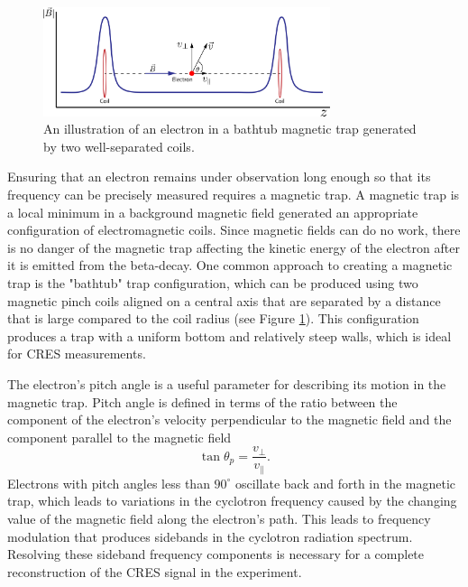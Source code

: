 \begin{figure}[htbp]
    \centering
    \includegraphics*[width=0.75\textwidth]{figs/Chapter-3/230628_bathtub_trap.png}
    \caption{\label{fig:chap3-bathtub-trap}An illustration of an electron in a bathtub magnetic trap generated by two well-separated coils.}
\end{figure}

Ensuring that an electron remains under observation long enough so that its frequency can be precisely measured requires a magnetic trap. A magnetic trap is a local minimum in a background magnetic field generated an appropriate configuration of electromagnetic coils. Since magnetic fields can do no work, there is no danger of the magnetic trap affecting the kinetic energy of the electron after it is emitted from the beta-decay. One common approach to creating a magnetic trap is the "bathtub" trap configuration, which can be produced using two magnetic pinch coils aligned on a central axis that are separated by a distance that is large compared to the coil radius (see Figure \ref{fig:chap3-bathtub-trap}). This configuration produces a trap with a uniform bottom and relatively steep walls, which is ideal for CRES measurements. 

The electron's pitch angle is a useful parameter for describing its motion in the magnetic trap. Pitch angle is defined in terms of the ratio between the component of the electron's velocity perpendicular to the magnetic field and the component parallel to the magnetic field
\begin{equation}
    \tan{\theta_p}=\frac{v_\perp}{v_\parallel}.
\end{equation}
Electrons with pitch angles less than $90^\circ$ oscillate back and forth in the magnetic trap, which leads to variations in the cyclotron frequency caused by the changing value of the magnetic field along the electron's path. This leads to frequency modulation that produces sidebands in the cyclotron radiation spectrum. Resolving these sideband frequency components is necessary for a complete reconstruction of the CRES signal in the experiment.

